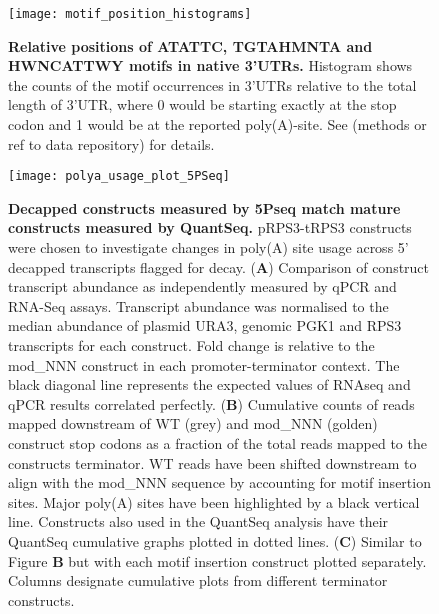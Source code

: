 \documentclass[../main.tex]{subfiles}
\begin{document}
\begin{figure}[ph!]

{\centering \texttt{[image: motif\_position\_histograms]} 

}

\caption[Relative positions of ATATTC, TGTAHMNTA and HWNCATTWY motifs in native 3'UTRs.]{\textbf{Relative positions of ATATTC, TGTAHMNTA and HWNCATTWY motifs in native 3'UTRs.} Histogram shows the counts of the motif occurrences in 3'UTRs relative to the total length of 3'UTR, where 0 would be starting exactly at the stop codon and 1 would be at the reported poly(A)-site. See (methods or ref to data repository) for details.}\label{fig:motif-position-histograms}
\end{figure}

\begin{figure}[ph!]

{\centering \texttt{[image: polya\_usage\_plot\_5PSeq]} 

}

\caption[Decapped constructs measured by 5Pseq match mature constructs measured by QuantSeq.]{\textbf{Decapped constructs measured by 5Pseq match mature constructs measured by QuantSeq.} pRPS3-tRPS3 constructs were chosen to investigate changes in poly(A) site usage across 5' decapped transcripts flagged for decay. (\textbf{A}) Comparison of construct transcript abundance as independently measured by qPCR and RNA-Seq assays. Transcript abundance was normalised to the median abundance of  plasmid URA3, genomic PGK1 and RPS3 transcripts for each construct. Fold change is relative to the mod\_NNN construct in each promoter-terminator context. The black diagonal line represents the expected values of RNAseq and qPCR results correlated perfectly. (\textbf{B}) Cumulative counts of reads mapped downstream of WT (grey) and mod\_NNN (golden) construct stop codons as a fraction of the total reads mapped to the constructs terminator. WT reads have been shifted downstream to align with the mod\_NNN sequence by accounting for motif insertion sites. Major poly(A) sites have been highlighted by a black vertical line. Constructs also used in the QuantSeq analysis have their QuantSeq cumulative graphs plotted in dotted lines. (\textbf{C}) Similar to Figure \textbf{B} but with each motif insertion construct plotted separately. Columns designate cumulative plots from different terminator constructs.}\label{fig:polyA-site-usage-5Pseq}
\end{figure}
\end{document}
